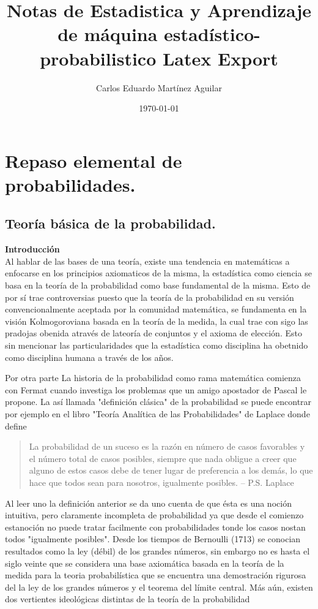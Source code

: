 \documentclass[letterpaper]{book}
\author{Carlos Eduardo Martínez Aguilar}
\date{\today}
\title{Notas de Estadistica y Aprendizaje de máquina estadístico-probabilistico Latex Export}
\begin{document}
\maketitle
\tableofcontents

\part{Repaso elemental de probabilidades.}
\label{sec:org9a00240}

\chapter{Teoría básica de la probabilidad.}
\label{sec:org2f2616e}

\noindent \textbf{\huge Introducción}
\vspace{0.5cm}\\
\noindent Al hablar de las bases de una teoría, existe una tendencia en matemáticas a enfocarse en los principios axiomaticos de la misma, la estadística como ciencia se basa en la teoría de la probabilidad como base fundamental de la misma. Esto de por sí trae controversias puesto que la teoría de la probabilidad en su versión convencionalmente aceptada por la comunidad matemática, se fundamenta en la visión Kolmogoroviana basada en la teoría de la medida, la cual trae con sigo las pradojas obenida através de lateoría de conjuntos y el axioma de elección. Esto sin mencionar las particularidades que la estadística como disciplina ha obetnido como disciplina humana a través de los años.

Por otra parte La historia de la probabilidad como rama matemática comienza con Fermat cuando investiga los problemas que un amigo apostador de Pascal le propone. La así llamada "definición clásica" de la probabilidad se puede encontrar por ejemplo en el libro "Teoría Analítica de las Probabilidades" de Laplace donde define

\begin{quote}
La probabilidad de un suceso es la razón en número de casos favorables y el número total de casos posibles, siempre que nada obligue a creer que alguno de estos casos debe de tener lugar de preferencia a los demás, lo que hace que todos sean para nosotros, igualmente posibles. -- P.S. Laplace
\end{quote}

Al leer uno la definición anterior se da uno cuenta de que ésta es una noción intuitiva, pero claramente incompleta de probabilidad ya que desde el comienzo estanoción no puede tratar facilmente con probabilidades tonde los casos nostan todos "igualmente posibles". Desde los tiempos de Bernoulli (1713) se conocian resultados como la ley (débil) de los grandes números, sin embargo no es hasta el siglo veinte que se considera una base axiomática basada en la teoría de la medida para la teoria probabilística que se encuentra una demostración rigurosa del la ley de los grandes números y el teorema del límite central. Más aún, existen dos vertientes ideológicas distintas de la teoría de la probabilidad
\end{document}
